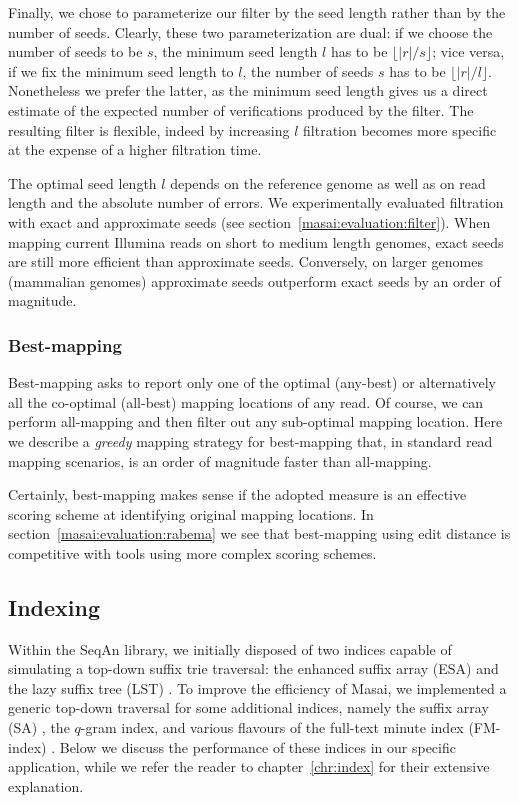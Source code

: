 Finally, we chose to parameterize our filter by the seed length rather than by the number of seeds.
Clearly, these two parameterization are dual: if we choose the number of seeds to be $s$, the minimum seed length $l$ has to be $\lfloor |r|/s \rfloor$; vice versa, if we fix the minimum seed length to $l$, the number of seeds $s$ has to be $\lfloor |r|/l \rfloor$.
Nonetheless we prefer the latter, as the minimum seed length gives us a direct estimate of the expected number of verifications produced by the filter.
The resulting filter is flexible, indeed by increasing $l$ filtration becomes more specific at the expense of a higher filtration time.

The optimal seed length $l$ depends on the reference genome as well as on read length and the absolute number of errors.
We experimentally evaluated filtration with exact and approximate seeds (see section~\ref{masai:evaluation:filter}).
When mapping current Illumina reads on short to medium length genomes, exact seeds are still more efficient than approximate seeds.
Conversely, on larger genomes (\eg mammalian genomes) approximate seeds outperform exact seeds by an order of magnitude.

\subsubsection{Best-mapping}

Best-mapping asks to report only one of the optimal (any-best) or alternatively all the co-optimal (all-best) mapping locations of any read.
Of course, we can perform all-mapping and then filter out any sub-optimal mapping location.
Here we describe a \emph{greedy} mapping strategy for best-mapping that, in standard read mapping scenarios, is an order of magnitude faster than all-mapping.

Certainly, best-mapping makes sense if the adopted measure is an effective scoring scheme at identifying original mapping locations.
In section~\ref{masai:evaluation:rabema} we see that best-mapping using edit distance is competitive with tools using more complex scoring schemes.


\subsection{Indexing}
\label{masai:engineering:index}

Within the SeqAn library, we initially disposed of two indices capable of simulating a top-down suffix trie traversal: the enhanced suffix array (ESA) \citep{Abouelhoda2004} and the lazy suffix tree (LST) \citep{Giegerich1999}.
To improve the efficiency of Masai, we implemented a generic top-down traversal for some additional indices, namely the suffix array (SA) \citep{Manber1990}, the $q$-gram index, and various flavours of the full-text minute index (FM-index) \citep{Ferragina2001}.
Below we discuss the performance of these indices in our specific application, while we refer the reader to chapter~\ref{chr:index} for their extensive explanation.

